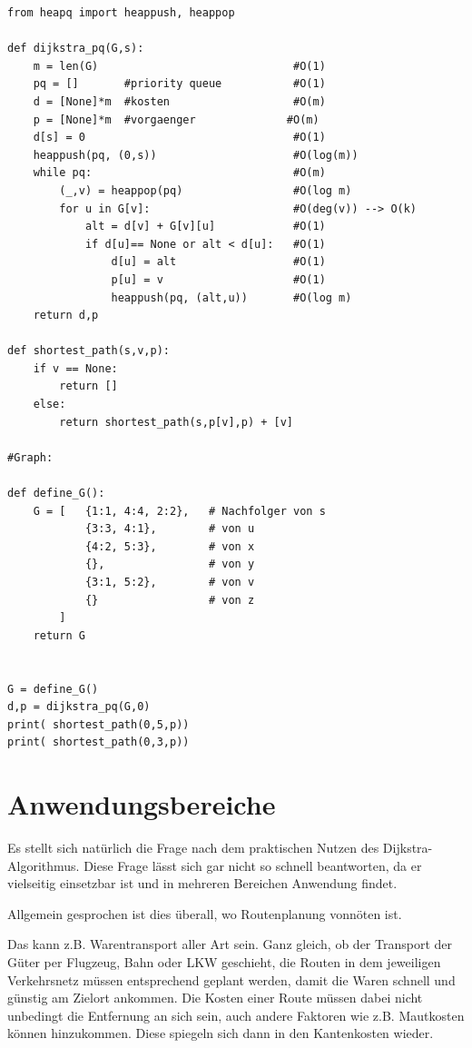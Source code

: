 \lstset{language=Python}
\begin{lstlisting}
from heapq import heappush, heappop

def dijkstra_pq(G,s):
    m = len(G)                              #O(1)
    pq = []       #priority queue           #O(1)
    d = [None]*m  #kosten                   #O(m)
    p = [None]*m  #vorgaenger		       #O(m)
    d[s] = 0                                #O(1)
    heappush(pq, (0,s))                     #O(log(m))
    while pq:                               #O(m)
        (_,v) = heappop(pq)                 #O(log m)
        for u in G[v]:                      #O(deg(v)) --> O(k)  
            alt = d[v] + G[v][u]            #O(1)
            if d[u]== None or alt < d[u]:   #O(1)
                d[u] = alt		            #O(1)	
               	p[u] = v                    #O(1)
                heappush(pq, (alt,u))       #O(log m)        
    return d,p

def shortest_path(s,v,p):
	if v == None:
		return []
	else:
		return shortest_path(s,p[v],p) + [v]
 
#Graph: 
    
def define_G():
    G = [   {1:1, 4:4, 2:2},   # Nachfolger von s
            {3:3, 4:1},        # von u
            {4:2, 5:3},        # von x
            {},                # von y
            {3:1, 5:2},        # von v
            {}                 # von z
        ]
    return G


G = define_G()
d,p = dijkstra_pq(G,0)
print( shortest_path(0,5,p))
print( shortest_path(0,3,p))
\end{lstlisting}

\section{Anwendungsbereiche}
Es stellt sich natürlich die Frage nach dem praktischen Nutzen des Dijkstra-Algorithmus. Diese Frage lässt sich gar nicht so schnell beantworten, da er vielseitig einsetzbar ist und in mehreren Bereichen Anwendung findet.

\parindent0pt Allgemein gesprochen ist dies überall, wo Routenplanung vonnöten ist.

\parindent0pt
Das kann z.B. Warentransport aller Art sein. Ganz gleich, ob der Transport der Güter per Flugzeug, Bahn oder LKW geschieht, die Routen in dem jeweiligen Verkehrsnetz müssen entsprechend geplant werden, damit die Waren schnell und günstig am Zielort ankommen. Die Kosten einer Route müssen dabei nicht unbedingt die Entfernung an sich sein, auch andere Faktoren wie z.B. Mautkosten können hinzukommen. Diese spiegeln sich dann in den Kantenkosten wieder.

